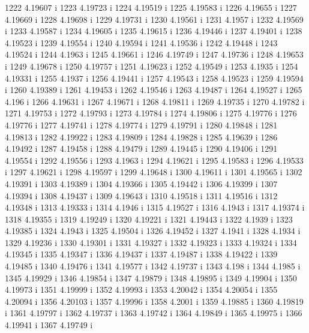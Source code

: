  1222  4.19607  i
 1223  4.19723  i
 1224  4.19519  i
 1225  4.19583  i
 1226  4.19655  i
 1227  4.19669  i
 1228  4.19698  i
 1229  4.19731  i
 1230  4.19561  i
 1231  4.1957  i
 1232  4.19569  i
 1233  4.19587  i
 1234  4.19605  i
 1235  4.19615  i
 1236  4.19446  i
 1237  4.19401  i
 1238  4.19523  i
 1239  4.19554  i
 1240  4.19594  i
 1241  4.19536  i
 1242  4.19448  i
 1243  4.19524  i
 1244  4.1963  i
 1245  4.19661  i
 1246  4.19749  i
 1247  4.19736  i
 1248  4.19653  i
 1249  4.19678  i
 1250  4.19757  i
 1251  4.19623  i
 1252  4.19549  i
 1253  4.1935  i
 1254  4.19331  i
 1255  4.1937  i
 1256  4.19441  i
 1257  4.19543  i
 1258  4.19523  i
 1259  4.19594  i
 1260  4.19389  i
 1261  4.19453  i
 1262  4.19546  i
 1263  4.19487  i
 1264  4.19527  i
 1265  4.196  i
 1266  4.19631  i
 1267  4.19671  i
 1268  4.19811  i
 1269  4.19735  i
 1270  4.19782  i
 1271  4.19753  i
 1272  4.19793  i
 1273  4.19784  i
 1274  4.19806  i
 1275  4.19776  i
 1276  4.19776  i
 1277  4.19741  i
 1278  4.19774  i
 1279  4.19791  i
 1280  4.19848  i
 1281  4.19813  i
 1282  4.19922  i
 1283  4.19809  i
 1284  4.19828  i
 1285  4.19639  i
 1286  4.19492  i
 1287  4.19458  i
 1288  4.19479  i
 1289  4.19445  i
 1290  4.19406  i
 1291  4.19554  i
 1292  4.19556  i
 1293  4.1963  i
 1294  4.19621  i
 1295  4.19583  i
 1296  4.19533  i
 1297  4.19621  i
 1298  4.19597  i
 1299  4.19648  i
 1300  4.19611  i
 1301  4.19565  i
 1302  4.19391  i
 1303  4.19389  i
 1304  4.19366  i
 1305  4.19442  i
 1306  4.19399  i
 1307  4.19394  i
 1308  4.19437  i
 1309  4.19643  i
 1310  4.19518  i
 1311  4.19516  i
 1312  4.19348  i
 1313  4.19333  i
 1314  4.1946  i
 1315  4.19527  i
 1316  4.1943  i
 1317  4.19374  i
 1318  4.19355  i
 1319  4.19249  i
 1320  4.19221  i
 1321  4.19443  i
 1322  4.1939  i
 1323  4.19385  i
 1324  4.1943  i
 1325  4.19504  i
 1326  4.19452  i
 1327  4.1941  i
 1328  4.1934  i
 1329  4.19236  i
 1330  4.19301  i
 1331  4.19327  i
 1332  4.19323  i
 1333  4.19324  i
 1334  4.19345  i
 1335  4.19347  i
 1336  4.19437  i
 1337  4.19487  i
 1338  4.19422  i
 1339  4.19485  i
 1340  4.19476  i
 1341  4.19577  i
 1342  4.19737  i
 1343  4.198  i
 1344  4.1985  i
 1345  4.19929  i
 1346  4.19854  i
 1347  4.19879  i
 1348  4.19895  i
 1349  4.19904  i
 1350  4.19973  i
 1351  4.19999  i
 1352  4.19993  i
 1353  4.20042  i
 1354  4.20054  i
 1355  4.20094  i
 1356  4.20103  i
 1357  4.19996  i
 1358  4.2001  i
 1359  4.19885  i
 1360  4.19819  i
 1361  4.19797  i
 1362  4.19737  i
 1363  4.19742  i
 1364  4.19849  i
 1365  4.19975  i
 1366  4.19941  i
 1367  4.19749  i
